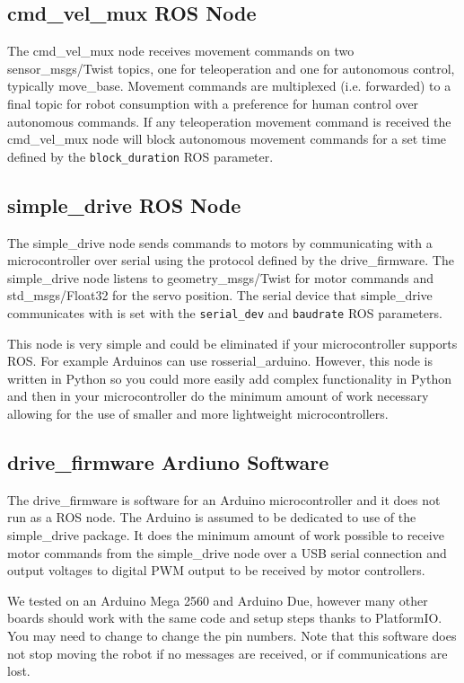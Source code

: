 \documentclass[runningheads,a4paper]{llncs}
\begin{document}
\subsection{cmd\_vel\_mux ROS Node}

The cmd\_vel\_mux node receives movement commands on two sensor\_msgs/Twist topics, one for teleoperation and one for autonomous control, typically move\_base. Movement commands are multiplexed (i.e. forwarded) to a final topic for robot consumption with a preference for human control over autonomous commands. If any teleoperation movement command is received the cmd\_vel\_mux node will block autonomous movement commands for a set time defined by the \texttt{block\_duration} ROS parameter.

\subsection{simple\_drive ROS Node}

The simple\_drive node sends commands to motors by communicating with a microcontroller over serial using the protocol defined by the drive\_firmware. The simple\_drive node listens to geometry\_msgs/Twist for motor commands and std\_msgs/Float32 for the servo position. The serial device that simple\_drive communicates with is set with the \texttt{serial\_dev} and \texttt{baudrate} ROS parameters.

This node is very simple and could be eliminated if your microcontroller supports ROS. For example Arduinos can use rosserial\_arduino. However, this node is written in Python so you could more easily add complex functionality in Python and then in your microcontroller do the minimum amount of work necessary allowing for the use of smaller and more lightweight microcontrollers.

\subsection{drive\_firmware Ardiuno Software}\label{drive_firmware}

The drive\_firmware is software for an Arduino microcontroller and it does not run as a ROS node. The Arduino is assumed to be dedicated to use of the simple\_drive package. It does the minimum amount of work possible to receive motor commands from the simple\_drive node over a USB serial connection and output voltages to digital PWM output to be received by motor controllers.

We tested on an Arduino Mega 2560 and Arduino Due, however many other boards should work with the same code and setup steps thanks to PlatformIO. You may need to change to change the pin numbers. Note that this software does not stop moving the robot if no messages are received, or if communications are lost.
\end{document}
